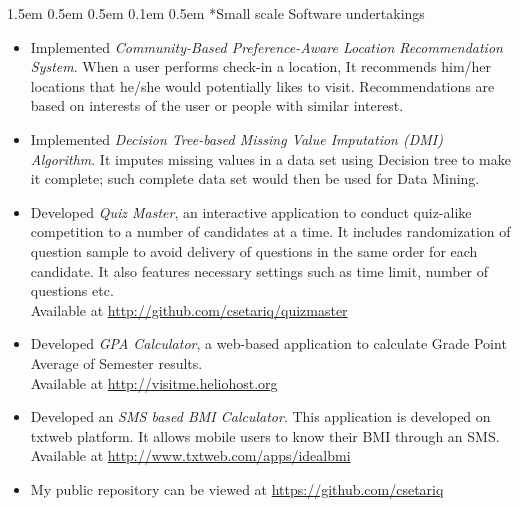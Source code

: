 \documentclass[a4paper, 12pt]{article}
\makeatletter
\renewcommand\section{\@startsection{section}{1}{\z@}%
                                  {1.5em \@plus 0.5em \@minus 0.5em}%
                                  {0.1em \@plus 0.5em}%
                                  {\small\bfseries\sc}}
\makeatother
\begin{document}
\section*{Small scale Software undertakings}
\begin{adjustwidth}{1.3em}{0pt}
\begin{itemize}
  \item Implemented \emph{Community-Based Preference-Aware Location
  Recommendation System}. When a user performs check-in a location, It
  recommends him/her locations that he/she would potentially likes to visit.
  Recommendations are based on interests of the user or people with similar
  interest.

  \item Implemented \emph{Decision Tree-based Missing Value Imputation (DMI)
  Algorithm}. It imputes missing values in a data set using Decision tree to make
  it complete; such complete data set would then be used for Data Mining.

       \item Developed \emph{Quiz Master}, an interactive application to conduct
  quiz-alike competition to a number of candidates at a time. It includes
  randomization of question sample to avoid delivery of questions in the same
  order for each candidate. It also features necessary settings such as time
  limit, number of questions etc.\\
  Available at \url{http://github.com/csetariq/quizmaster}

  \item Developed \emph{GPA Calculator}, a web-based application to calculate
  Grade Point Average of Semester results.\\
  Available at \url{http://visitme.heliohost.org}

  \item Developed an \emph{SMS based BMI Calculator}. This application is
  developed on txtweb platform. It allows mobile users to know their BMI through
  an SMS.\\
  Available at \url{http://www.txtweb.com/apps/idealbmi}

  \item My public repository can be viewed at \url{https://github.com/csetariq}

\end{itemize}
\end{adjustwidth}
\end{document}
